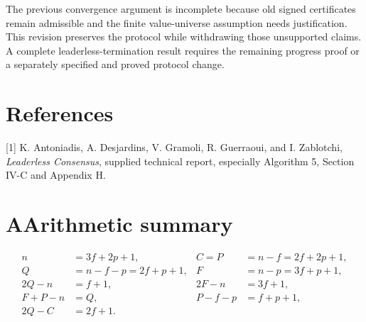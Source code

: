 \documentclass[11pt,a4paper]{article}
\begin{document}
The previous convergence argument is incomplete because old signed certificates remain admissible and the finite value-universe assumption needs justification. This revision preserves the protocol while withdrawing those unsupported claims. A complete leaderless-termination result requires the remaining progress proof or a separately specified and proved protocol change.
\section*{References}
[1] K. Antoniadis, A. Desjardins, V. Gramoli, R. Guerraoui, and I. Zablotchi, \emph{Leaderless Consensus}, supplied technical report, especially Algorithm 5, Section IV-C and Appendix H.
\section*{A\quad Arithmetic summary}
\begin{align*}
n&=3f+2p+1,& C=P&=n-f=2f+2p+1,\\
Q&=n-f-p=2f+p+1,& F&=n-p=3f+p+1,\\
2Q-n&=f+1,&2F-n&=3f+1,\\
F+P-n&=Q,&P-f-p&=f+p+1,\\
2Q-C&=2f+1.
\end{align*}
\end{document}
